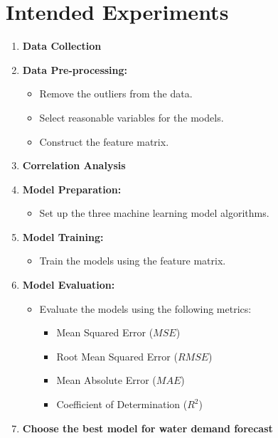 \documentclass[12pt]{article}
\begin{document}
\section*{Intended Experiments}
\begin{enumerate}

    \item \textbf{Data Collection}


    \item \textbf{Data Pre-processing:}
    \begin{itemize}
        \item Remove the outliers from the data.
        \item Select reasonable variables for the models.
        \item Construct the feature matrix.
    \end{itemize}

    \item \textbf{Correlation Analysis}
    
    \item \textbf{Model Preparation:}
    \begin{itemize}
        \item Set up the three machine learning model algorithms.
    \end{itemize}

    \item \textbf{Model Training:}
    \begin{itemize}
        \item Train the models using the feature matrix.
    \end{itemize}

    \item \textbf{Model Evaluation:}
    \begin{itemize}
        \item Evaluate the models using the following metrics:
        \begin{itemize}
            \item Mean Squared Error ($MSE$)
            \item Root Mean Squared Error ($RMSE$)
            \item Mean Absolute Error ($MAE$)
            \item Coefficient of Determination ($R^2$)
        \end{itemize}
    \end{itemize}

    \item \textbf{Choose the best model for water demand forecast}
\end{enumerate}
\end{document}
